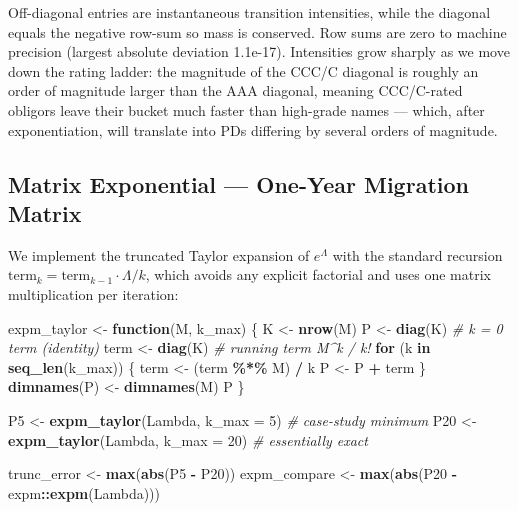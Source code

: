 \documentclass[
  11pt,
]{article}
\newenvironment{Shaded}{\begin{snugshade}}{\end{snugshade}}
\newcommand{\AttributeTok}[1]{\textcolor[rgb]{0.13,0.29,0.53}{#1}}
\newcommand{\CommentTok}[1]{\textcolor[rgb]{0.56,0.35,0.01}{\textit{#1}}}
\newcommand{\ControlFlowTok}[1]{\textcolor[rgb]{0.13,0.29,0.53}{\textbf{#1}}}
\newcommand{\DecValTok}[1]{\textcolor[rgb]{0.00,0.00,0.81}{#1}}
\newcommand{\FunctionTok}[1]{\textcolor[rgb]{0.13,0.29,0.53}{\textbf{#1}}}
\newcommand{\NormalTok}[1]{#1}
\newcommand{\OtherTok}[1]{\textcolor[rgb]{0.56,0.35,0.01}{#1}}
\newcommand{\SpecialCharTok}[1]{\textcolor[rgb]{0.81,0.36,0.00}{\textbf{#1}}}
\begin{document}
Off-diagonal entries are instantaneous transition intensities, while the
diagonal equals the negative row-sum so mass is conserved. Row sums are
zero to machine precision (largest absolute deviation 1.1e-17).
Intensities grow sharply as we move down the rating ladder: the
magnitude of the CCC/C diagonal is roughly an order of magnitude larger
than the AAA diagonal, meaning CCC/C-rated obligors leave their bucket
much faster than high-grade names --- which, after exponentiation, will
translate into PDs differing by several orders of magnitude.

\subsection{Matrix Exponential --- One-Year Migration
Matrix}\label{matrix-exponential-one-year-migration-matrix}

We implement the truncated Taylor expansion of \(e^{\Lambda}\) with the
standard recursion
\(\mathrm{term}_k = \mathrm{term}_{k-1} \cdot \Lambda / k\), which
avoids any explicit factorial and uses one matrix multiplication per
iteration:

\begin{Shaded}
\begin{Highlighting}[]
\NormalTok{expm\_taylor }\OtherTok{\textless{}{-}} \ControlFlowTok{function}\NormalTok{(M, k\_max) \{}
\NormalTok{    K    }\OtherTok{\textless{}{-}} \FunctionTok{nrow}\NormalTok{(M)}
\NormalTok{    P    }\OtherTok{\textless{}{-}} \FunctionTok{diag}\NormalTok{(K)            }\CommentTok{\# k = 0 term (identity)}
\NormalTok{    term }\OtherTok{\textless{}{-}} \FunctionTok{diag}\NormalTok{(K)            }\CommentTok{\# running term  M\^{}k / k!}
    \ControlFlowTok{for}\NormalTok{ (k }\ControlFlowTok{in} \FunctionTok{seq\_len}\NormalTok{(k\_max)) \{}
\NormalTok{        term }\OtherTok{\textless{}{-}}\NormalTok{ (term }\SpecialCharTok{\%*\%}\NormalTok{ M) }\SpecialCharTok{/}\NormalTok{ k}
\NormalTok{        P    }\OtherTok{\textless{}{-}}\NormalTok{ P }\SpecialCharTok{+}\NormalTok{ term}
\NormalTok{    \}}
    \FunctionTok{dimnames}\NormalTok{(P) }\OtherTok{\textless{}{-}} \FunctionTok{dimnames}\NormalTok{(M)}
\NormalTok{    P}
\NormalTok{\}}

\NormalTok{P5  }\OtherTok{\textless{}{-}} \FunctionTok{expm\_taylor}\NormalTok{(Lambda, }\AttributeTok{k\_max =} \DecValTok{5}\NormalTok{)   }\CommentTok{\# case{-}study minimum}
\NormalTok{P20 }\OtherTok{\textless{}{-}} \FunctionTok{expm\_taylor}\NormalTok{(Lambda, }\AttributeTok{k\_max =} \DecValTok{20}\NormalTok{)  }\CommentTok{\# essentially exact}

\NormalTok{trunc\_error  }\OtherTok{\textless{}{-}} \FunctionTok{max}\NormalTok{(}\FunctionTok{abs}\NormalTok{(P5 }\SpecialCharTok{{-}}\NormalTok{ P20))}
\NormalTok{expm\_compare }\OtherTok{\textless{}{-}} \FunctionTok{max}\NormalTok{(}\FunctionTok{abs}\NormalTok{(P20 }\SpecialCharTok{{-}}\NormalTok{ expm}\SpecialCharTok{::}\FunctionTok{expm}\NormalTok{(Lambda)))}
\end{Highlighting}
\end{Shaded}
\end{document}

